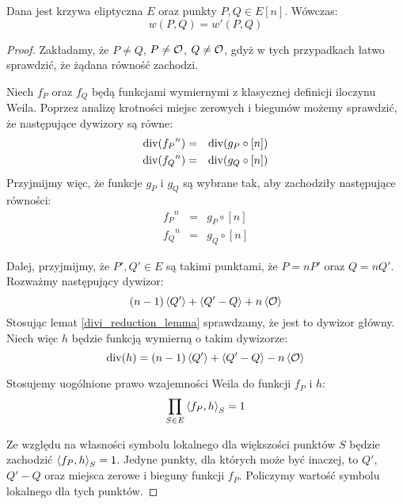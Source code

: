 \begin{theorem}
Dana jest krzywa eliptyczna $E$ oraz punkty $P, Q \in E[n]$.
Wówczas:
\begin{equation}
w(P, Q) = w'(P, Q)
\end{equation}
\end{theorem}

\begin{proof}
Zakładamy, że $P \neq Q$, $P \neq \mathcal{O}$, $Q \neq \mathcal{O}$,
gdyż w tych przypadkach łatwo sprawdzić, że żądana równość zachodzi.

Niech $f_P$ oraz $f_Q$ będą funkcjami wymiernymi
z klasycznej definicji iloczynu Weila.
Poprzez analizę krotności miejsc zerowych i biegunów możemy sprawdzić,
że następujące dywizory są równe:
\begin{eqnarray*}
\operatorname{div}({f_P}^n) & = & \operatorname{div}(g_P \circ [n]) \\
\operatorname{div}({f_Q}^n) & = & \operatorname{div}(g_Q \circ [n])
\end{eqnarray*}
Przyjmijmy więc, że funkcje $g_P$ i $g_Q$ są wybrane tak,
aby zachodziły następujące równości:
\begin{eqnarray*}
{f_P}^n & = & g_P \circ [n] \\
{f_Q}^n & = & g_Q \circ [n]
\end{eqnarray*}

Dalej, przyjmijmy, że $P', Q' \in E$ są takimi punktami,
że $P = nP'$ oraz $Q = nQ'$.
Rozważmy następujący dywizor:
\begin{equation*}
(n-1)\left\langle Q'\right\rangle + \left\langle Q' - Q\right\rangle + n\left\langle\mathcal{O}\right\rangle
\end{equation*}
Stosując lemat \ref{divi_reduction_lemma} sprawdzamy,
że jest to dywizor główny.
Niech więc $h$ będzie funkcją wymierną o takim dywizorze:
\begin{equation*}
\operatorname{div}(h) = (n-1)\left\langle Q'\right\rangle + \left\langle Q' - Q\right\rangle - n\left\langle\mathcal{O}\right\rangle
\end{equation*}

Stosujemy uogólnione prawo wzajemności Weila do funkcji $f_P$ i $h$:
\begin{equation}\label{weil_reci_fp_h}
\prod_{S \in E} \left\langle f_P , h \right\rangle_{S} = 1
\end{equation}

Ze względu na własności symbolu lokalnego dla większości punktów $S$
będzie zachodzić $\left\langle f_P , h \right\rangle_{S} = 1$.
Jedyne punkty, dla których może być inaczej,
to $Q'$, $Q' - Q$ oraz miejsca zerowe i bieguny funkcji $f_P$.
Policzymy wartość symbolu lokalnego dla tych punktów.


\end{proof}
